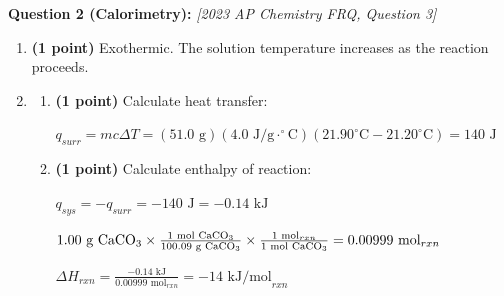 \documentclass[12pt,letterpaper]{article}
\begin{document}
\noindent \textbf{Question 2 (Calorimetry):} \textit{[2023 AP Chemistry FRQ, Question 3]}
\begin{enumerate}[label=(\alph*)]
    \item \textbf{(1 point)} Exothermic. The solution temperature increases as the reaction proceeds.
    
    \item 
    \begin{enumerate}[label=(\roman*)]
        \item \textbf{(1 point)} Calculate heat transfer:
        
        $q_{surr} = mc\Delta T = (51.0\text{ g})(4.0\text{ J/g}\cdot^\circ\text{C})(21.90^\circ\text{C} - 21.20^\circ\text{C}) = 140\text{ J}$
        
        \item \textbf{(1 point)} Calculate enthalpy of reaction:
        
        $q_{sys} = -q_{surr} = -140\text{ J} = -0.14\text{ kJ}$
        
        $1.00\text{ g }\ce{CaCO3} \times \frac{1\text{ mol }\ce{CaCO3}}{100.09\text{ g }\ce{CaCO3}} \times \frac{1\text{ mol}_{rxn}}{1\text{ mol }\ce{CaCO3}} = 0.00999\text{ mol}_{rxn}$
        
        $\Delta H_{rxn} = \frac{-0.14\text{ kJ}}{0.00999\text{ mol}_{rxn}} = -14\text{ kJ/mol}_{rxn}$
    \end{enumerate}
\end{enumerate}
\end{document}
